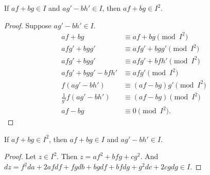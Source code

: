 \begin{conjecture}
  If $af + bg \in I$ and $ag' - bh' \in I$,
  then $af + bg \in I^2$.
\end{conjecture}
\begin{proof}
  Suppose $ag' - bh' \in I$.
  \begin{align*}
    af + bg &\equiv af + bg \pmod I^2 \\
    afg' + bgg' &\equiv afg' + bgg' \pmod I^2 \\
    afg' + bgg' &\equiv afg' + bfh' \pmod I^2 \\
    afg' + bgg' - bfh' &\equiv afg' \pmod I^2 \\
    f(ag' - bh') &\equiv (af - bg)g' \pmod I^2 \\
    \frac 1 {g'}f(ag' - bh') &\equiv (af - bg) \pmod I^2 \\
    af - bg &\equiv 0 \pmod I^2.
  \end{align*}
\end{proof}
\begin{conjecture}
  If $af + bg \in I^2$,
  then $af + bg \in I$ and $ag' - bh' \in I$.
\end{conjecture}
\begin{proof}
  Let $z \in I^2$.
  Then $z = af^2 + bfg + cg^2$.
  And $dz = f^2da + 2afdf + fgdb + bgdf + bfdg + g^2dc + 2cgdg \in I$.
\end{proof}

